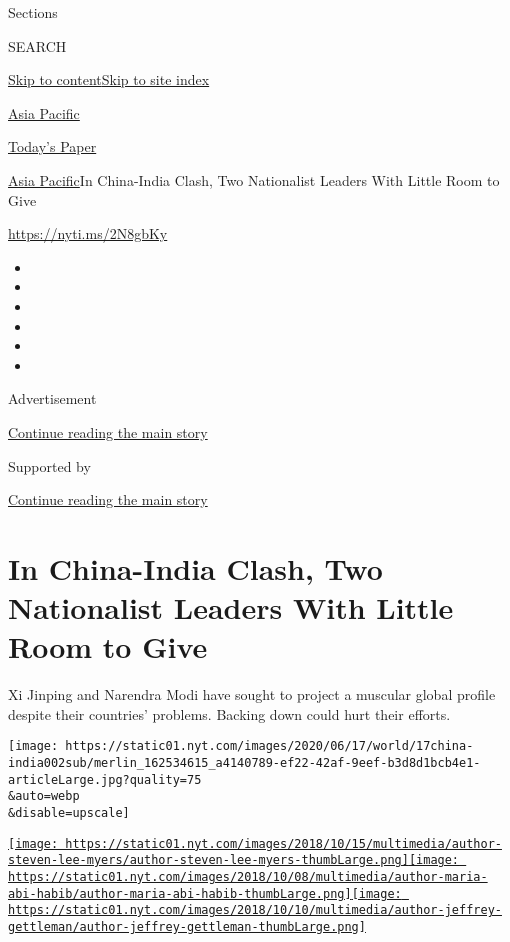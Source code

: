 Sections

SEARCH

\protect\hyperlink{site-content}{Skip to
content}\protect\hyperlink{site-index}{Skip to site index}

\href{https://www.nytimes.com/section/world/asia}{Asia Pacific}

\href{https://myaccount.nytimes.com/auth/login?response_type=cookie\&client_id=vi}{}

\href{https://www.nytimes.com/section/todayspaper}{Today's Paper}

\href{/section/world/asia}{Asia Pacific}\textbar{}In China-India Clash,
Two Nationalist Leaders With Little Room to Give

\url{https://nyti.ms/2N8gbKy}

\begin{itemize}
\item
\item
\item
\item
\item
\item
\end{itemize}

Advertisement

\protect\hyperlink{after-top}{Continue reading the main story}

Supported by

\protect\hyperlink{after-sponsor}{Continue reading the main story}

\hypertarget{in-china-india-clash-two-nationalist-leaders-with-little-room-to-give}{%
\section{In China-India Clash, Two Nationalist Leaders With Little Room
to
Give}\label{in-china-india-clash-two-nationalist-leaders-with-little-room-to-give}}

Xi Jinping and Narendra Modi have sought to project a muscular global
profile despite their countries' problems. Backing down could hurt their
efforts.

\texttt{[image: https://static01.nyt.com/images/2020/06/17/world/17china-india002sub/merlin\_162534615\_a4140789-ef22-42af-9eef-b3d8d1bcb4e1-articleLarge.jpg?quality=75\\\&auto=webp\\\&disable=upscale]}

\href{https://www.nytimes.com/by/steven-lee-myers}{\texttt{[image: https://static01.nyt.com/images/2018/10/15/multimedia/author-steven-lee-myers/author-steven-lee-myers-thumbLarge.png]}}\href{https://www.nytimes.com/by/maria-abi-habib}{\texttt{[image: https://static01.nyt.com/images/2018/10/08/multimedia/author-maria-abi-habib/author-maria-abi-habib-thumbLarge.png]}}\href{https://www.nytimes.com/by/jeffrey-gettleman}{\texttt{[image: https://static01.nyt.com/images/2018/10/10/multimedia/author-jeffrey-gettleman/author-jeffrey-gettleman-thumbLarge.png]}}

